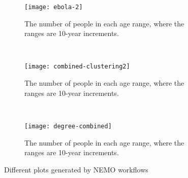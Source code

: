 \begin{figure}[H]
\begin{subfigure}[b]{0.3\textwidth}
        \texttt{[image: ebola-2]}
        \caption{The number of people in each age range, where the
ranges are 10-year increments.}
        \label{fig:ebola-2}
    \end{subfigure}
    ~
    \begin{subfigure}[b]{0.3\textwidth}
        \texttt{[image: combined-clustering2]}
        \caption{The number of people in each age range, where the
ranges are 10-year increments.}
        \label{fig:combined-clustering2}
    \end{subfigure}
    ~
    \begin{subfigure}[b]{0.3\textwidth}
        \texttt{[image: degree-combined]}
        \caption{The number of people in each age range, where the
ranges are 10-year increments.}
        \label{fig:degree-combined}
    \end{subfigure}
    \caption{Different plots generated by NEMO workflows}\label{fig:nemo-plots}
\end{figure}